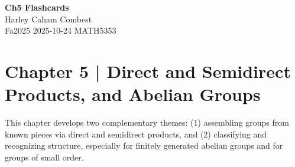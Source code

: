 \documentclass[11pt]{article}
\theoremstyle{definition}
\begin{document}
\begin{center}
\Large\textbf{Ch5 Flashcards} \\
\large Harley Caham Combest \\
\large Fa2025 2025-10-24 MATH5353
\end{center}

\newpage

\dotfill
\section*{Chapter 5 | Direct and Semidirect Products, and Abelian Groups}
\dotfill

\newpage

This chapter develops two complementary themes: (1) assembling groups from known pieces via direct and semidirect products, and (2) classifying and recognizing structure, especially for finitely generated abelian groups and for groups of small order.
\end{document}
